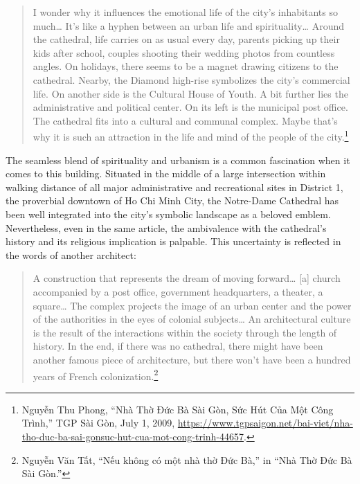 \begin{quotation}
I wonder why it influences the emotional life of the city’s inhabitants so much… It’s like a hyphen between an urban life and spirituality… Around the cathedral, life carries on as usual every day, parents picking up their kids after school, couples shooting their wedding photos from countless angles. On holidays, there seems to be a magnet drawing citizens to the cathedral. Nearby, the Diamond high-rise symbolizes the city’s commercial life. On another side is the Cultural House of Youth. A bit further lies the administrative and political center. On its left is the municipal post office. The cathedral fits into a cultural and communal complex. Maybe that’s why it is such an attraction in the life and mind of the people of the city.\footnote{Nguyễn Thu Phong, “Nhà Thờ Đức Bà Sài Gòn, Sức Hút Của Một Công Trình,” TGP Sài Gòn, July 1, 2009, \url{https://www.tgpsaigon.net/bai-viet/nha-tho-duc-ba-sai-gonsuc-hut-cua-mot-cong-trinh-44657}.}
\end{quotation}

The seamless blend of spirituality and urbanism is a common fascination when it comes to this building. Situated in the middle of a large intersection within walking distance of all major administrative and recreational sites in District 1, the proverbial downtown of Ho Chi Minh City, the Notre-Dame Cathedral has been well integrated into the city’s symbolic landscape as a beloved emblem. Nevertheless, even in the same article, the ambivalence with the cathedral’s history and its religious implication is palpable. This uncertainty is reflected in the words of another architect:

\begin{quotation}
A construction that represents the dream of moving forward… [a] church accompanied by a post office, government headquarters, a theater, a square… The complex projects the image of an urban center and the power of the authorities in the eyes of colonial subjects… An architectural culture is the result of the interactions within the society through the length of history. In the end, if there was no cathedral, there might have been another famous piece of architecture, but there won’t have been a hundred years of French colonization.\footnote{Nguyễn Văn Tất, “Nếu không có một nhà thờ Đức Bà,” in “Nhà Thờ Đức Bà Sài Gòn.”}
\end{quotation}

